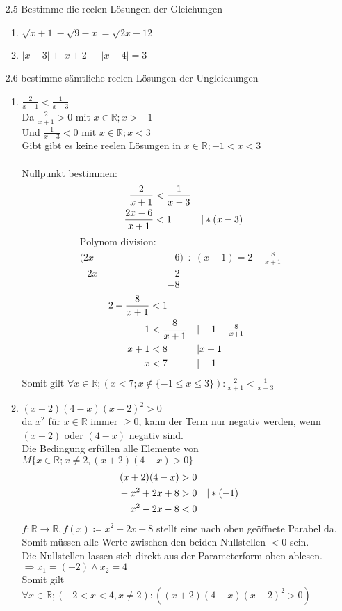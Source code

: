 \documentclass[12pt,letterpaper]{article}
\newcommand{\alignleft}[1]{\tag*{\llap{\makebox[\linewidth][l]{$#1$}}}}
\newcommand{\LLeftrightarrow}{ \alignleft{\Leftrightarrow}}
\newcommand{\eqinfo}[1]{&\makebox[2cm][l]{$\vert #1$}}
\newcommand{\Eqn}[3]{#1 &#2 #3}
\newcommand{\geqnf}[3]{\Eqn{#1}{#2}{#3}\\}
\newcommand{\geqn}[3]{\LLeftrightarrow\Eqn{#1}{#2}{#3}\\}
\newcommand{\geqni}[4]{\LLeftrightarrow\Eqn{#1}{#2}{#3}\eqinfo{#4}\\}
\begin{document}
\begin{enumerate}
\item [2.5] Bestimme die reelen Lösungen der Gleichungen
\begin{enumerate}
\item $\sqrt{x+1}-\sqrt{9-x}=\sqrt{2x-12}$
\item $|x-3|+|x+2|-|x-4|=3$
\end{enumerate}
\item [2.6] bestimme sämtliche reelen Lösungen der Ungleichungen
\begin{enumerate}
\item $\frac{2}{x+1}<\frac{1}{x-3}$\\
Da $\frac{2}{x+1} > 0$ mit $x\in\mathbb{R};x>-1$\\
Und $\frac{1}{x-3} < 0$ mit $x\in\mathbb{R};x<3$\\
Gibt gibt es keine reelen Lösungen in $x\in\mathbb{R};-1<x<3$\\
\\
Nullpunkt bestimmen:\\
\begin{align*}
	\geqnf{\frac{2}{x+1}}{<}{\frac{1}{x-3}}
	\geqni{\frac{2x-6}{x+1}}{<}{1}{*(x-3)}	
\end{align*}
\begin{align*}
	\text{Polynom division: }\\
	(2x&-6)\div(x+1)=2-\frac{8}{x+1}\\
	-2x&-2\\
	&-8
\end{align*}
\begin{align*}
	\geqnf{2-\frac{8}{x+1}}{<}{1}
	\geqni{1}{<}{\frac{8}{x+1}}{-1+\frac{8}{x+1}}
	\geqni{x+1}{<}{8}{x+1}
	\geqni{x}{<}{7}{-1}	
\end{align*}
Somit gilt $\forall x\in\mathbb{R};(x<7;x\notin\{-1\leq x\leq3\}):\frac{2}{x+1}<\frac{1}{x-3}$
\item $\left(x+2\right)\left(4-x\right)\left(x-2\right)^2>0$\\
da $x^2$ für $x\in\mathbb{R}$ immer $\geq 0$, kann der Term nur negativ werden, wenn $(x+2)$ oder $(4-x)$ negativ sind.\\
Die Bedingung erfüllen alle Elemente von $M \lbrace x\in\mathbb{R}; x\neq 2, (x+2)(4-x)>0 \rbrace$\\
\begin{align*}
\geqnf{(x+2)(4-x)}{>}{0}
\geqni{-x^2+2x+8}{>}{0}{*(-1)}
\geqn{x^2-2x-8}{<}{0}
\end{align*}
$f: \mathbb{R}\to\mathbb{R}, f(x)\coloneqq x^2-2x-8$ stellt eine nach oben geöffnete Parabel da. Somit müssen alle Werte zwischen den beiden Nullstellen $<0$ sein.\\
Die Nullstellen lassen sich direkt aus der Parameterform oben ablesen.\\
$\Rightarrow x_1=(-2) \land x_2=4$\\
Somit gilt $\forall x\in\mathbb{R};(-2<x<4, x\neq 2):(\left(x+2\right)\left(4-x\right)\left(x-2\right)^2>0)$
\end{enumerate}
\end{enumerate}
\end{document}
